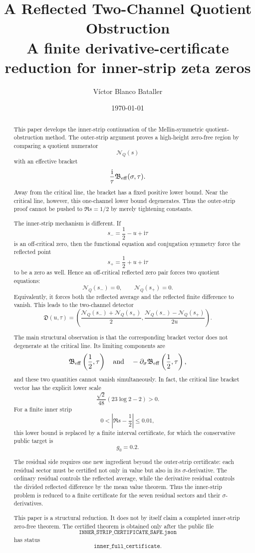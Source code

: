 \documentclass[11pt]{article}
\title{
\textbf{A Reflected Two-Channel Quotient Obstruction}\\[0.35em]
\large A finite derivative-certificate reduction for inner-strip zeta zeros
}
\author{V\'ictor Blanco Bataller}
\date{\today}
\newcommand{\ii}{\mathrm{i}}
\newcommand{\NQ}{\mathcal N_Q}
\newcommand{\Beff}{\mathfrak B_{\rm eff}}
\newcommand{\Dvec}{\mathfrak D}
\newcommand{\gev}{g_0}
\begin{document}
\maketitle


\begin{abstract}
This paper develops the inner-strip continuation of the Mellin-symmetric
quotient-obstruction method.  The outer-strip argument proves a high-height
zero-free region by comparing a quotient numerator
\[
        \NQ(s)
\]
with an effective bracket
\[
        \frac{\ii}{\tau}\Beff(\sigma,\tau).
\]
Away from the critical line, the bracket has a fixed positive lower bound.
Near the critical line, however, this one-channel lower bound degenerates.
Thus the outer-strip proof cannot be pushed to \(\Re s=1/2\) by merely
tightening constants.

The inner-strip mechanism is different.  If
\[
        s_-=\frac12-u+\ii\tau
\]
is an off-critical zero, then the functional equation and conjugation symmetry
force the reflected point
\[
        s_+=\frac12+u+\ii\tau
\]
to be a zero as well.  Hence an off-critical reflected zero pair forces two
quotient equations:
\[
        \NQ(s_-)=0,
        \qquad
        \NQ(s_+)=0.
\]
Equivalently, it forces both the reflected average and the reflected finite
difference to vanish.  This leads to the two-channel detector
\[
        \Dvec(u,\tau)
        =
        \left(
        \frac{\NQ(s_-)+\NQ(s_+)}2,
        \frac{\NQ(s_-)-\NQ(s_+)}{2u}
        \right).
\]

The main structural observation is that the corresponding bracket vector does
not degenerate at the critical line.  Its limiting components are
\[
        \Beff\left(\frac12,\tau\right)
        \quad\text{and}\quad
        -\partial_\sigma\Beff\left(\frac12,\tau\right),
\]
and these two quantities cannot vanish simultaneously.  In fact, the critical
line bracket vector has the explicit lower scale
\[
        \frac{\sqrt2}{48}(23\log2-2)>0.
\]
For a finite inner strip
\[
        0<\left|\Re s-\frac12\right|\le0.01,
\]
this lower bound is replaced by a finite interval certificate, for which the
conservative public target is
\[
        \gev=0.2.
\]

The residual side requires one new ingredient beyond the outer-strip
certificate: each residual sector must be certified not only in value but also
in its \(\sigma\)-derivative.  The ordinary residual controls the reflected
average, while the derivative residual controls the divided reflected
difference by the mean value theorem.  Thus the inner-strip problem is reduced
to a finite certificate for the seven residual sectors and their
\(\sigma\)-derivatives.

This paper is a structural reduction.  It does not by itself claim a completed
inner-strip zero-free theorem.  The certified theorem is obtained only after
the public file
\[
        \texttt{INNER\_STRIP\_CERTIFICATE\_SAFE.json}
\]
has status
\[
        \texttt{inner\_full\_certificate}.
\]
\end{abstract}
\end{document}
